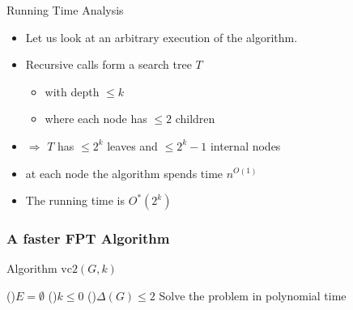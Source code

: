 \begin{frame}{Running Time Analysis}
 \begin{itemize}
  \item Let us look at an arbitrary execution of the algorithm.
  \item Recursive calls form a \alert{search tree} $T$
  \begin{itemize}
   \item with depth $\le k$
   \item where each node has $\le 2$ children
  \end{itemize}
  \item $\Rightarrow$ $T$ has $\le 2^k$ leaves and $\le 2^{k}-1$ internal nodes
  \item at each node the algorithm spends time $n^{O(1)}$
  \item The running time is $O^*(2^k)$
 \end{itemize}
\end{frame}



\begin{frame}
 \frametitle{A faster FPT Algorithm}
 
 \pause{}

\begin{algorithm}[H]
\SetArgSty{}

\alert{Algorithm $\text{vc2}(G,k)$}\;
\BlankLine{}

   \If(){$E = \emptyset$} {
   }
   \ElseIf(){$k \le 0$} {
   }
   \ElseIf(){$\Delta(G) \le 2$} {
      Solve the problem in polynomial time\;
   }
\end{algorithm}

\end{frame}


